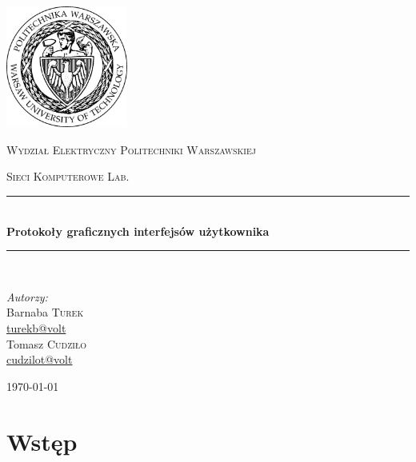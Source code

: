 \documentclass[a4paper]{article}
\newcommand{\HRule}{\rule{\linewidth}{0.5mm}}
\begin{document}
\begin{titlepage}

  \begin{center}


    \includegraphics[width=0.3\textwidth]{logo.jpg}\\[1cm]

    \begin{onehalfspace}
      \textsc{\LARGE Wydział Elektryczny Politechniki Warszawskiej}\\[1.5cm]
    \end{onehalfspace}



    \textsc{Sieci Komputerowe Lab.}\\[0.5cm]

    \HRule \\[0.4cm]
    {\huge \bfseries Protokoły graficznych interfejsów użytkownika}\\[0.2cm]
    \HRule \\[1.5cm]

    \begin{flushleft} \large
      \emph{Autorzy:}\\
      Barnaba \textsc{Turek}\\
      \href{mailto:turekb@volt}{turekb@volt}\\
      Tomasz \textsc{Cudziło}\\
      \href{mailto:cudzilot@volt}{cudzilot@volt}\\
    \end{flushleft}
    \vfill

    {\large \today}

  \end{center}

\end{titlepage}
\sloppy

\setcounter{tocdepth}{4}
\tableofcontents

\section{Wstęp}
\end{document}
